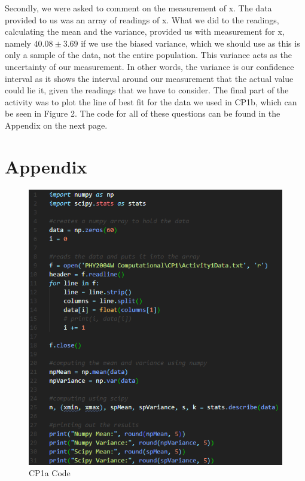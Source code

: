 \documentclass[12pt]{article}
\begin{document}
    \noindent
    Secondly, we were asked to comment on the measurement of x. The data provided to us was 
    an array of readings of x. What we did to the readings, calculating the mean and the 
    variance, provided us with measurement for x, namely $40.08 \pm 3.69$ if we use the 
    biased variance, which we should use as this is only a sample of the data, not the 
    entire population. This variance acts as the uncertainty of our measurement. In other 
    words, the variance is our confidence interval as it shows the interval around our 
    measurement that the actual value could lie it, given the readings that we have to consider.
    \newline
    \newline
    The final part of the activity was to plot the line of best fit for the data we used in 
    CP1b, which can be seen in Figure 2.
    \newline
    \newline
    The code for all of these questions can be found in the Appendix on the next page.
    

    \newpage
    \section{Appendix}

    \begin{figure}[H]
        \begin{center}
            \includegraphics[scale=0.7]{CP1a code.png}
            \caption{CP1a Code}
            \label{Appendix 1}
        \end{center}
    \end{figure}
\end{document}
